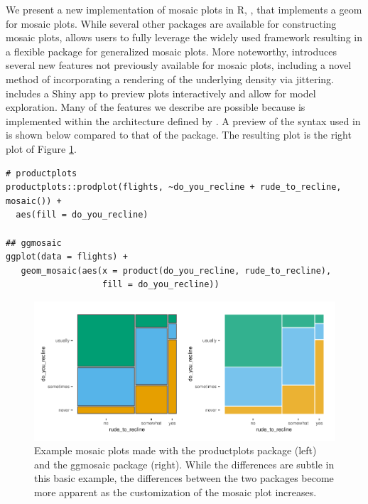 We present a new implementation of mosaic plots in R, , that implements a  geom for mosaic plots. While several other packages are available for constructing mosaic plots,  allows users to fully leverage the widely used  framework resulting in a flexible package for generalized mosaic plots. More noteworthy,  introduces several new features not previously available for mosaic plots, including a novel method of incorporating a rendering of the underlying density via jittering.  includes a Shiny app to preview plots interactively and allow for model exploration. Many of the features we describe are possible because  is implemented within the architecture defined by . A preview of the syntax used in  is shown below compared to that of the  package. The resulting plot is the right plot of Figure \ref{fig:prodplot}.

\begin{verbatim}
# productplots
productplots::prodplot(flights, ~do_you_recline + rude_to_recline, mosaic()) + 
  aes(fill = do_you_recline)

## ggmosaic
ggplot(data = flights) +
   geom_mosaic(aes(x = product(do_you_recline, rude_to_recline),
                   fill = do_you_recline))
\end{verbatim}

\begin{figure}

{\centering \includegraphics[width=1\linewidth]{jeppson-hofmann_files/figure-latex/prodplot-1} 

}

\caption{Example mosaic plots made with the productplots package (left) and the ggmosaic package (right). While the differences are subtle in this basic example, the differences between the two packages become more apparent as the customization of the mosaic plot increases.}\label{fig:prodplot}
\end{figure}

